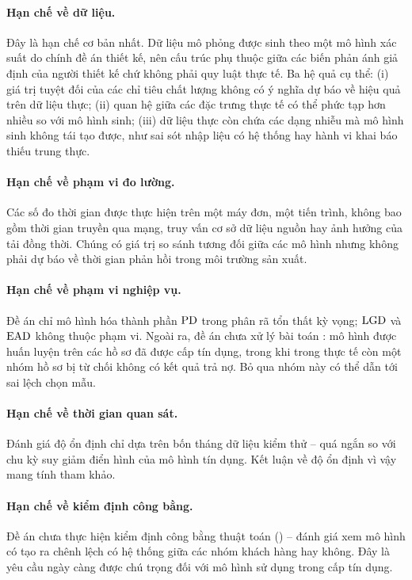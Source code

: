 \paragraph{Hạn chế về dữ liệu.} Đây là hạn chế cơ bản nhất. Dữ liệu mô phỏng được
sinh theo một mô hình xác suất do chính đề án thiết kế, nên cấu trúc phụ thuộc
giữa các biến phản ánh giả định của người thiết kế chứ không phải quy luật thực
tế. Ba hệ quả cụ thể: (i) giá trị tuyệt đối của các chỉ tiêu chất lượng không có
ý nghĩa dự báo về hiệu quả trên dữ liệu thực; (ii) quan hệ giữa các đặc trưng
thực tế có thể phức tạp hơn nhiều so với mô hình sinh; (iii) dữ liệu thực còn
chứa các dạng nhiễu mà mô hình sinh không tái tạo được, như sai sót nhập liệu có
hệ thống hay hành vi khai báo thiếu trung thực.

\paragraph{Hạn chế về phạm vi đo lường.} Các số đo thời gian được thực hiện trên
một máy đơn, một tiến trình, không bao gồm thời gian truyền qua mạng, truy vấn cơ
sở dữ liệu nguồn hay ảnh hưởng của tải đồng thời. Chúng có giá trị so sánh tương
đối giữa các mô hình nhưng không phải dự báo về thời gian phản hồi trong môi
trường sản xuất.

\paragraph{Hạn chế về phạm vi nghiệp vụ.} Đề án chỉ mô hình hóa thành phần $\mathrm{PD}$
trong phân rã tổn thất kỳ vọng; $\mathrm{LGD}$ và $\mathrm{EAD}$ không thuộc phạm vi. Ngoài ra,
đề án chưa xử lý bài toán : mô hình được huấn luyện trên
các hồ sơ đã được cấp tín dụng, trong khi trong thực tế còn một nhóm hồ sơ bị từ
chối không có kết quả trả nợ. Bỏ qua nhóm này có thể dẫn tới sai lệch chọn mẫu.

\paragraph{Hạn chế về thời gian quan sát.} Đánh giá độ ổn định chỉ dựa trên bốn
tháng dữ liệu kiểm thử -- quá ngắn so với chu kỳ suy giảm điển hình của mô hình
tín dụng. Kết luận về độ ổn định vì vậy mang tính tham khảo.

\paragraph{Hạn chế về kiểm định công bằng.} Đề án chưa thực hiện kiểm định công
bằng thuật toán () -- đánh giá xem mô hình có tạo ra chênh
lệch có hệ thống giữa các nhóm khách hàng hay không. Đây là yêu cầu ngày càng
được chú trọng đối với mô hình sử dụng trong cấp tín dụng.

